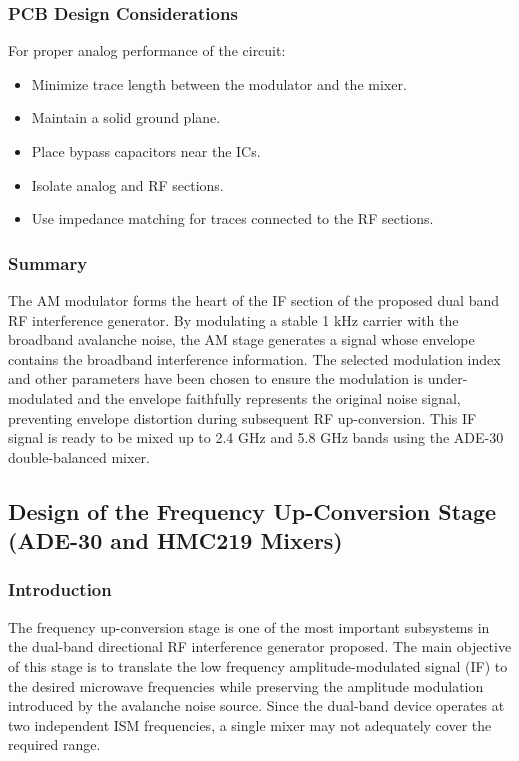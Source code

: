 \documentclass[12pt,a4paper]{report}
\begin{document}
	\subsubsection{PCB Design Considerations}
	For proper analog performance of the circuit:
	\begin{itemize}
		\item Minimize trace length between the modulator and the mixer.
		\item Maintain a solid ground plane.
		\item Place bypass capacitors near the ICs.
		\item Isolate analog and RF sections.
		\item Use impedance matching for traces connected to the RF sections.
	\end{itemize}
	\subsubsection{Summary}
	The AM modulator forms the heart of the IF section of the proposed dual band RF interference generator. By modulating a stable 1 kHz carrier with the broadband avalanche noise, the AM stage generates a signal whose envelope contains the broadband interference information. The selected modulation index and other parameters have been chosen to ensure the modulation is under-modulated and the envelope faithfully represents the original noise signal, preventing envelope distortion during subsequent RF up-conversion. This IF signal is ready to be mixed up to 2.4 GHz and 5.8 GHz bands using the ADE-30 double-balanced mixer.
	\subsection{Design of the Frequency Up-Conversion Stage (ADE-30 and HMC219 Mixers)}
	
	\subsubsection{Introduction}
	The frequency up-conversion stage is one of the most important subsystems in the dual-band directional RF interference generator proposed. The main objective of this stage is to translate the low frequency amplitude-modulated signal (IF) to the desired microwave frequencies while preserving the amplitude modulation introduced by the avalanche noise source. Since the dual-band device operates at two independent ISM frequencies, a single mixer may not adequately cover the required range.
	
\end{document}
